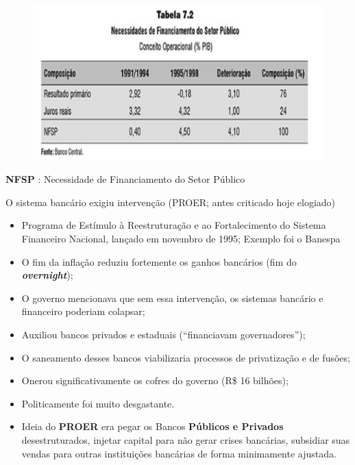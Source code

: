 \documentclass[a4paper,12pt]{article}[abntex2]
\begin{document}
\begin{figure}[H]
    \centering
    \includegraphics[width=0.7\linewidth]{Imagens/a14i9.png}
\end{figure}
\textbf{NFSP }: Necessidade de Financiamento do Setor Público

O sistema bancário exigiu intervenção (PROER; antes criticado hoje elogiado)\begin{itemize}
    \item Programa de Estímulo à Reestruturação e ao Fortalecimento do Sistema Financeiro Nacional, lançado em novembro de 1995; Exemplo foi o Banespa
    \item O fim da inflação reduziu fortemente os ganhos bancários (fim do \textbf{\textit{overnight}});
    \item O governo mencionava que sem essa intervenção, os sistemas bancário e financeiro poderiam colapsar;
    \item Auxiliou bancos privados e estaduais (“financiavam governadores”);
    \item O saneamento desses bancos viabilizaria processos de privatização e de fusões;
    \item Onerou significativamente os cofres do governo (R\$ 16 bilhões);
    \item Politicamente foi muito desgastante.
    \item Ideia do \textbf{PROER} era pegar os Bancos \textbf{Públicos e Privados} desestruturados, injetar capital para não gerar crises bancárias, subsidiar suas vendas para outras instituições bancárias de forma minimamente ajustada.
\end{itemize}
\end{document}
